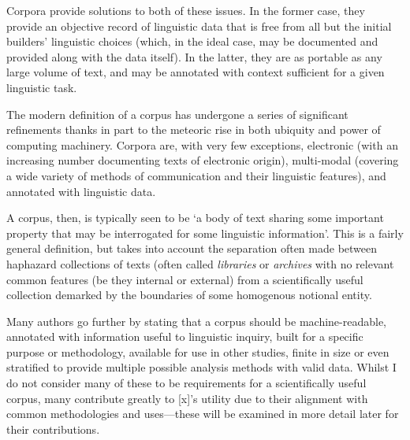 Corpora provide solutions to both of these issues.  In the former case, they provide an objective record of linguistic data that is free from all but the initial builders' linguistic choices (which, in the ideal case, may be documented and provided along with the data itself).  In the latter, they are as portable as any large volume of text, and may be annotated with context sufficient for a given linguistic task.


The modern definition of a corpus has undergone a series of significant refinements thanks in part to the meteoric rise in both ubiquity and power of computing machinery.  Corpora are, with very few exceptions, electronic (with an increasing number documenting texts of electronic origin), multi-modal (covering a wide variety of methods of communication and their linguistic features), and annotated with linguistic data.  


A corpus, then, is typically seen to be `a body of text sharing some important property that may be interrogated for some linguistic information'.  This is a fairly general definition, but takes into account the separation often made between haphazard collections of texts (often called \textsl{libraries} or \textsl{archives} with no relevant common features (be they internal or external) from a scientifically useful collection demarked by the boundaries of some homogenous notional entity.

Many authors %
go further by stating that a corpus should be machine-readable, annotated with information useful to linguistic inquiry, built for a specific purpose or methodology, available for use in other studies, finite in size or even stratified to provide multiple possible analysis methods with valid data.  Whilst I do not consider many of these to be requirements for a scientifically useful corpus, many contribute greatly to [x]'s utility due to their alignment with common methodologies and uses---these will be examined in more detail later for their contributions.









